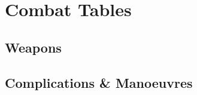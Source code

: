 
\section{Combat Tables}
\label{combatAppendix}

\begin{multicols}{2}

\initiativechart

\armourchart

\shieldchart

\end{multicols}

\chasechart

\huntchart

\subsection{Weapons}

\improvisedWeaponsChart

\weaponsChart

\esotericWeaponsChart

\pagebreak

\subsection{Complications \& Manoeuvres}


\printindex[spells]

\pagebreak

\printindex

